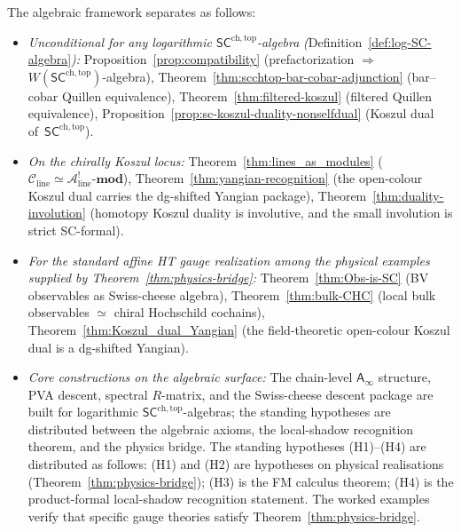 \documentclass[11pt]{memoir}
\newcommand{\cA}{\mathcal{A}}
\newcommand{\Ainf}{\mathsf{A}_{\infty}}
\newcommand{\SCchtop}{{\mathsf{SC}^{\mathrm{ch,top}}}}
\begin{document}
\begin{remark}
\label{rem:conditional-list}
The algebraic framework separates as follows:
\begin{itemize}
\item \emph{Unconditional for any logarithmic $\SCchtop$-algebra}
 \emph{(}Definition~\ref{def:log-SC-algebra}\emph{):}
 Proposition~\ref{prop:compatibility} (prefactorization $\Rightarrow$
 $W(\SCchtop)$-algebra),
 Theorem~\ref{thm:scchtop-bar-cobar-adjunction} (bar--cobar Quillen
 equivalence),
 Theorem~\ref{thm:filtered-koszul} (filtered Quillen equivalence),
 Proposition~\ref{prop:sc-koszul-duality-nonselfdual} (Koszul dual
 of~$\SCchtop$).
\item \emph{On the chirally Koszul locus:}
 Theorem~\ref{thm:lines_as_modules}
 ($\mathcal{C}_{\mathrm{line}} \simeq
 \cA^!_{\mathrm{line}}\text{-}\mathbf{mod}$),
 Theorem~\ref{thm:yangian-recognition}
 (the open-colour Koszul dual carries the dg-shifted Yangian
 package),
	 Theorem~\ref{thm:duality-involution}
	 (homotopy Koszul duality is involutive, and the small involution
	 is strict SC-formal).
\item \emph{For the standard affine HT gauge realization among the
 physical examples supplied by
 Theorem~\ref{thm:physics-bridge}:}
 Theorem~\ref{thm:Obs-is-SC}
 (BV observables as Swiss-cheese algebra),
 Theorem~\ref{thm:bulk-CHC}
 (local bulk observables $\simeq$ chiral Hochschild cochains),
 Theorem~\ref{thm:Koszul_dual_Yangian}
 (the field-theoretic open-colour Koszul dual is a
 dg-shifted Yangian).
\item \emph{Core constructions on the algebraic surface:}
 The chain-level $\Ainf$ structure, PVA descent, spectral
 $R$-matrix, and the Swiss-cheese descent package are built for
 logarithmic $\SCchtop$-algebras; the standing
 hypotheses are distributed between the algebraic axioms, the
 local-shadow recognition theorem, and the physics bridge.
 The standing hypotheses (H1)--(H4) are distributed as follows:
 (H1) and (H2) are hypotheses on physical realisations
 (Theorem~\ref{thm:physics-bridge}); (H3) is the FM calculus
 theorem; (H4) is the product-formal local-shadow recognition
 statement.
 The worked examples verify that specific gauge theories
 satisfy Theorem~\ref{thm:physics-bridge}.
\end{itemize}
\end{remark}




\end{document}
